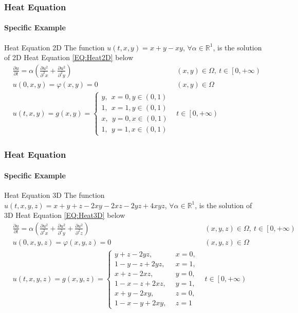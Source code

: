 \begin{frame}
  \frametitle{Heat Equation}
  \framesubtitle{Specific Example}
  \begin{block}{Heat Equation 2D}
    The function $u(t,x,y) = x + y - xy$, $\forall \alpha \in \mathbb{R}^1 $, is the solution of 2D Heat Equation \ref{EQ:Heat2D} below
    \begin{align}\label{EQ:Heat2D}
      &\frac{\partial u}{\partial t} = \alpha \left(
        \frac{\partial u^2}{\partial^2 x}
        +
        \frac{\partial u^2}{\partial^2 y}
      \right) &(x,y) \in \Omega, \: t \in \left[0, +\infty\right)  \nonumber\\
      &u(0,x,y)  = \varphi(x,y) = 0 &(x,y) \in \Omega\\
      &u(t,x,y)
       = g(x,y)
       = \begin{cases}
        y, \:\: x=0, y\in\left(0,1\right)\\
        1, \:\: x=1, y\in\left(0,1\right)\\
        x, \:\: y=0, x\in\left(0,1\right)\\
        1, \:\: y =1, x\in\left(0,1\right)
      \end{cases}
      &t \in \left[0, +\infty\right) \nonumber
    \end{align}
  \end{block}
\end{frame}


\begin{frame}
  \frametitle{Heat Equation}
  \framesubtitle{Specific Example}
  \begin{block}{Heat Equation 3D}
    The function $u(t,x,y,z) = x + y + z - 2xy - 2xz - 2yz + 4xyz$, $\forall \alpha \in \mathbb{R}^1 $, is the solution of 3D Heat Equation \ref{EQ:Heat3D} below
    \begin{align}\label{EQ:Heat3D}
      &\frac{\partial u}{\partial t} = \alpha \left(
        \frac{\partial u^2}{\partial^2 x}
        +
        \frac{\partial u^2}{\partial^2 y}
        +
        \frac{\partial u^2}{\partial^2 z}
      \right) & (x,y, z) \in \Omega, \: t \in \left[0, +\infty\right) 
                                                                      \nonumber\\
      &u(0,x,y,z)  = \varphi(x,y,z) = 0 &(x,y,z) \in \Omega\\
      &  u(t,x,y,z) = g(x,y,z) = 
      \begin{cases}
        y+z -2yz        , \:\: &x=0,\\
        1 - y - z + 2yz , \:\: &x=1,\\
        x+z - 2xz       , \:\: &y=0,\\
        1 - x - z + 2xz , \:\: &y =1,\\
        x+y - 2xy       , \:\: &z=0,\\
        1 - x - y + 2xy , \:\: &z=1
      \end{cases}
      &t \in \left[0, +\infty\right) \nonumber
    \end{align}
  \end{block}
\end{frame}






